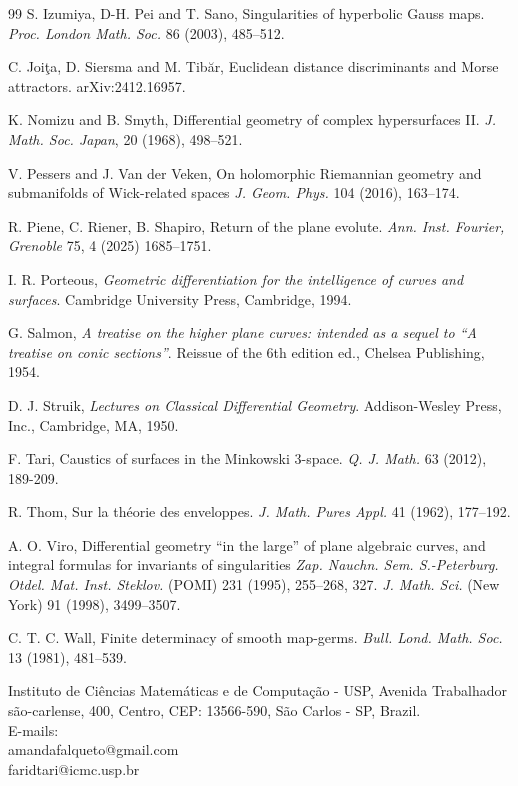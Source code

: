 \documentclass[12pt,a4paper]{article}
\begin{document}
\begin{thebibliography}{99}
 S. Izumiya,  D-H. Pei and T. Sano,
Singularities of hyperbolic Gauss maps. {\it Proc. London Math. Soc.} 86 (2003), 485--512.


C. Joi\c{t}a, D. Siersma and M. Tib\u{a}r, Euclidean distance discriminants and Morse attractors. 	arXiv:2412.16957.


K. Nomizu and B. Smyth, Differential geometry of complex hypersurfaces II. {\it J. Math. Soc. Japan}, 20 (1968), 498--521.

V. Pessers and J. Van der Veken, 
On holomorphic Riemannian geometry and submanifolds of Wick-related spaces
{\it J. Geom. Phys.} 104 (2016), 163--174.

R. Piene, C. Riener, B. Shapiro, Return of the plane evolute. {\it Ann. Inst. Fourier, Grenoble} 75, 4 (2025) 1685--1751.


I. R. Porteous,  {\it Geometric differentiation for the intelligence of curves and surfaces}.
Cambridge University Press, Cambridge, 1994.

G. Salmon, {\it A treatise on the higher plane curves: intended as a sequel to “A treatise on conic sections”}. Reissue of the 6th edition ed., Chelsea Publishing, 1954.

D. J. Struik, {\it Lectures on Classical Differential Geometry}.
Addison-Wesley Press, Inc., Cambridge, MA, 1950.

 F. Tari, Caustics of surfaces in the Minkowski 3-space. {\it  Q. J. Math.} 63 (2012), 189-209. 

R. Thom, Sur la théorie des enveloppes.
{\it J. Math. Pures Appl.}  41 (1962), 177--192.

A. O. Viro, Differential geometry ``in the large'' of plane algebraic curves, and integral formulas for invariants of singularities
{\it Zap. Nauchn. Sem. S.-Peterburg. Otdel. Mat. Inst. Steklov.} (POMI) 231 (1995), 255–268, 327.
{\it J. Math. Sci.} (New York) 91 (1998), 3499--3507.

C. T. C. Wall,  Finite determinacy of smooth map-germs. 
{\it Bull. Lond. Math. Soc.} 13 (1981), 481--539.


\end{thebibliography}
	
\noindent
Instituto de Ciências Matemáticas e de Computação - USP, Avenida Trabalhador são-carlense, 400, Centro, CEP: 13566-590, São Carlos - SP, Brazil.
\\
E-mails: 
\\
amandafalqueto@gmail.com\\
faridtari@icmc.usp.br
\end{document}
